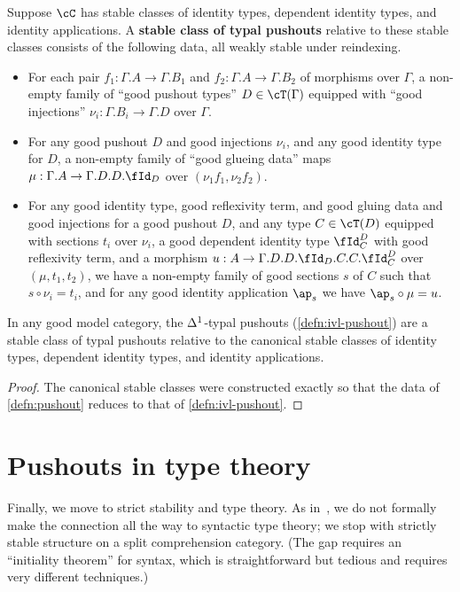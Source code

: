 \documentclass{amsart}
\let\C\cC
\let\T\cT
\let\Id\fId
\begin{document}
\begin{defn}\label{defn:pushout}
  Suppose $\C$ has stable classes of identity types, dependent identity types, and identity applications.
  A \textbf{stable class of typal pushouts} relative to these stable classes consists of the following data, all weakly stable under reindexing.
  \begin{itemize}
  \item For each pair $f_1:\Gamma.A\to \Gamma.B_1$ and $f_2:\Gamma.A\to \Gamma.B_2$ of morphisms over $\Gamma$, a non-empty family of ``good pushout types'' $D\in\T(\Gamma)$ equipped with ``good injections'' $\nu_i : \Gamma.B_i \to \Gamma.D$ over $\Gamma$.
  \item For any good pushout $D$ and good injections $\nu_i$, and any good identity type for $D$, a non-empty family of ``good glueing data'' maps $\mu : \Gamma.A \to \Gamma.D.D.\Id_D$ over $(\nu_1 f_1,\nu_2 f_2)$.
  \item For any good identity type, good reflexivity term, and good gluing data and good injections for a good pushout $D$, and any type $C\in\T(D)$ equipped with sections $t_i$ over $\nu_i$, a good dependent identity type $\Id^D_C$ with good reflexivity term, and a morphism $u:A\to \Gamma.D.D.\Id_D.C.C.\Id^D_C$ over $(\mu,t_1,t_2)$, we have a non-empty family of good sections $s$ of $C$ such that $s \circ \nu_i = t_i$, and for any good identity application $\ap_s$ we have $\ap_s \circ \mu = u$.
  \end{itemize}
\end{defn}

\begin{thm}\label{thm:model-pushout}
  In any good model category, the ${\Delta^1}$-typal pushouts (\cref{defn:ivl-pushout}) are a stable class of typal pushouts relative to the canonical stable classes of identity types, dependent identity types, and identity applications.
\end{thm}
\begin{proof}
  The canonical stable classes were constructed exactly so that the data of \cref{defn:pushout} reduces to that of \cref{defn:ivl-pushout}.
\end{proof}


\section{Pushouts in type theory}
\label{sec:pushouts-type-theory}

Finally, we move to strict stability and type theory.
As in~\cite{lw:localuniv}, we do not formally make the connection all the way to syntactic type theory; we stop with strictly stable structure on a split comprehension category.
(The gap requires an ``initiality theorem'' for syntax, which is straightforward but tedious and requires very different techniques.)
\end{document}
